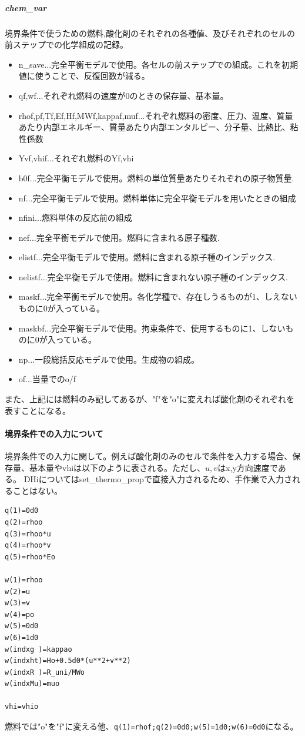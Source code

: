 \documentclass{jsarticle}
\begin{document}
\subparagraph{chem\_var}境界条件で使うための燃料,酸化剤のそれぞれの各種値、及びそれぞれのセルの前ステップでの化学組成の記録。
\begin{itemize}
\item n\_save...完全平衡モデルで使用。各セルの前ステップでの組成。これを初期値に使うことで、反復回数が減る。
\item qf,wf...それぞれ燃料の速度が0のときの保存量、基本量。
\item rhof,pf,Tf,Ef,Hf,MWf,kappaf,muf...それぞれ燃料の密度、圧力、温度、質量あたり内部エネルギー、質量あたり内部エンタルピー、分子量、比熱比、粘性係数
\item Yvf,vhif...それぞれ燃料のYf,vhi
\item b0f...完全平衡モデルで使用。燃料の単位質量あたりそれぞれの原子物質量.
\item nf...完全平衡モデルで使用。燃料単体に完全平衡モデルを用いたときの組成
\item nfini...燃料単体の反応前の組成
\item nef...完全平衡モデルで使用。燃料に含まれる原子種数.
\item elistf...完全平衡モデルで使用。燃料に含まれる原子種のインデックス.
\item nelistf...完全平衡モデルで使用。燃料に含まれない原子種のインデックス.
\item maskf...完全平衡モデルで使用。各化学種で、存在しうるものが1、しえないものに0が入っている。
\item maskbf...完全平衡モデルで使用。拘束条件で、使用するものに1、しないものに0が入っている。
\item np...一段総括反応モデルで使用。生成物の組成。
\item of...当量でのo/f
\end{itemize}
また、上記には燃料のみ記してあるが、"f"を"o"に変えれば酸化剤のそれぞれを表すことになる。

\paragraph{境界条件での入力について}%

境界条件での入力に関して。例えば酸化剤のみのセルで条件を入力する場合、保存量、基本量やvhiは以下のように表される。ただし、$u,v$はx,y方向速度である。
DHiについてはset\_thermo\_propで直接入力されるため、手作業で入力されることはない。
\begin{verbatim}
q(1)=0d0
q(2)=rhoo
q(3)=rhoo*u
q(4)=rhoo*v
q(5)=rhoo*Eo

w(1)=rhoo
w(2)=u
w(3)=v
w(4)=po
w(5)=0d0
w(6)=1d0
w(indxg )=kappao
w(indxht)=Ho+0.5d0*(u**2+v**2)
w(indxR )=R_uni/MWo
w(indxMu)=muo

vhi=vhio
\end{verbatim}
燃料では"o"を"f"に変える他、\verb|q(1)=rhof;q(2)=0d0;w(5)=1d0;w(6)=0d0|になる。
\end{document}
